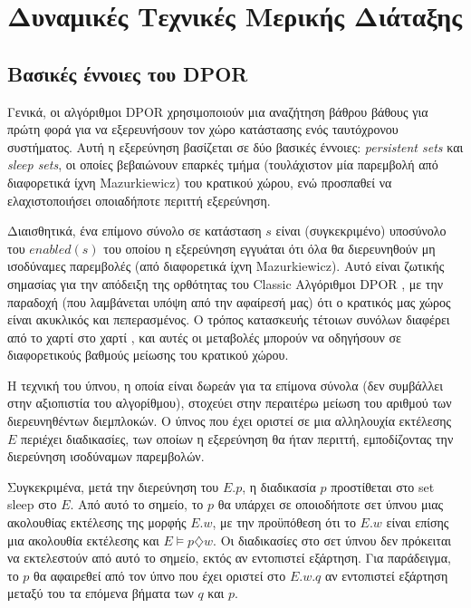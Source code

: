 \chapter{Δυναμικές Τεχνικές Μερικής Διάταξης}
\label{dpor}

\section{Βασικές έννοιες του DPOR}

Γενικά, οι αλγόριθμοι DPOR χρησιμοποιούν μια αναζήτηση βάθρου βάθους για πρώτη φορά για να εξερευνήσουν τον χώρο κατάστασης ενός ταυτόχρονου συστήματος.
Αυτή η εξερεύνηση βασίζεται σε δύο βασικές έννοιες: \textit{persistent sets} και \textit{sleep sets}, οι οποίες βεβαιώνουν
επαρκές τμήμα (τουλάχιστον μία παρεμβολή από διαφορετικά ίχνη Mazurkiewicz) του κρατικού χώρου,
ενώ προσπαθεί να ελαχιστοποιήσει οποιαδήποτε περιττή εξερεύνηση.

Διαισθητικά, ένα επίμονο σύνολο σε κατάσταση $s$ είναι (συγκεκριμένο) υποσύνολο του $enabled(s)$ του οποίου η εξερεύνηση εγγυάται ότι όλα
θα διερευνηθούν μη ισοδύναμες παρεμβολές (από διαφορετικά ίχνη Mazurkiewicz). Αυτό είναι ζωτικής σημασίας για την απόδειξη της ορθότητας του Classic
Αλγόριθμοι DPOR \cite{FlanaganDPOR}, με την παραδοχή
(που λαμβάνεται υπόψη από την αφαίρεσή μας) ότι ο κρατικός μας χώρος είναι ακυκλικός και πεπερασμένος.
Ο τρόπος κατασκευής τέτοιων συνόλων διαφέρει από το χαρτί στο χαρτί \cite{FlanaganDPOR, Lei:2006:RTC:1248722.1248743, 10.1007/3-540-53863-1_36},
και αυτές οι μεταβολές μπορούν να οδηγήσουν σε διαφορετικούς βαθμούς μείωσης του κρατικού χώρου.

Η τεχνική του ύπνου, η οποία είναι δωρεάν για τα επίμονα σύνολα (δεν συμβάλλει στην αξιοπιστία του αλγορίθμου),
στοχεύει στην περαιτέρω μείωση του αριθμού των διερευνηθέντων διεμπλοκών.
Ο ύπνος που έχει οριστεί σε μια αλληλουχία εκτέλεσης $E$ περιέχει διαδικασίες, των οποίων η εξερεύνηση θα ήταν περιττή,
εμποδίζοντας την διερεύνηση ισοδύναμων παρεμβολών.

Συγκεκριμένα, μετά την διερεύνηση του $E.p$, η διαδικασία $p$ προστίθεται στο set sleep
στο $E$. Από αυτό το σημείο, το $p$ θα υπάρχει σε οποιοδήποτε σετ ύπνου μιας ακολουθίας εκτέλεσης
της μορφής $E.w$, με την προϋπόθεση ότι το $E.w$ είναι επίσης μια ακολουθία εκτέλεσης και $E\models p \diamondsuit w$.
Οι διαδικασίες στο σετ ύπνου δεν πρόκειται να εκτελεστούν από αυτό το σημείο, εκτός αν εντοπιστεί εξάρτηση.
Για παράδειγμα, το $p$ θα αφαιρεθεί από τον ύπνο που έχει οριστεί στο $E.w.q$ αν εντοπιστεί εξάρτηση μεταξύ του
τα επόμενα βήματα των $q$ και $p$.

